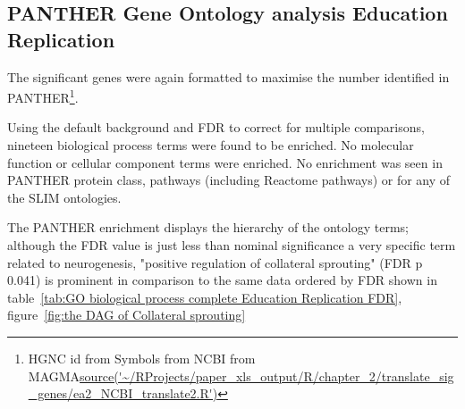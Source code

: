  \subsection{PANTHER Gene Ontology analysis Education Replication}
 
 The significant genes were again formatted to maximise the number identified in PANTHER\footnote{HGNC id from Symbols from NCBI from MAGMA\url{source('~/RProjects/paper_xls_output/R/chapter_2/translate_sig_genes/ea2_NCBI_translate2.R')}}.
 
 Using the default background and FDR to correct for multiple comparisons, nineteen biological process terms were found to be enriched. No molecular function or cellular component terms were enriched. No enrichment was seen in PANTHER protein class, pathways (including Reactome pathways) or for any of the SLIM ontologies. 
 
 
 
 
     
     
 
 The PANTHER enrichment displays the hierarchy of the ontology terms; although the FDR value is just less than nominal significance a very specific term related to neurogenesis, "positive regulation of collateral sprouting" (FDR p 0.041) is prominent in comparison to the same data ordered by FDR shown in table~\ref{tab:GO biological process complete Education Replication FDR}, figure~\ref{fig:the DAG of Collateral sprouting}

